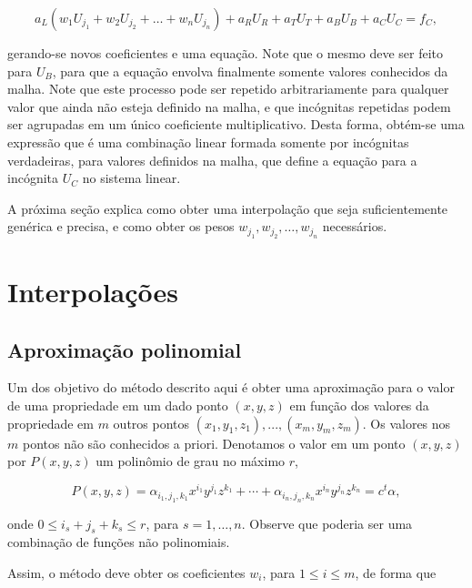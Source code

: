 \[
a_L \left( w_1 U_{j_1} + w_2 U_{j_2} + \dots + w_n U_{j_n} \right) + a_R U_{R} + a_T U_{T} + a_B U_{B} + a_C U_{C}  = f_{C},
\]

\noindent gerando-se novos coeficientes e uma equação. Note que o mesmo deve
ser feito para $U_B$, para que a equação envolva finalmente somente valores
conhecidos da malha. Note que este processo pode ser repetido arbitrariamente
para qualquer valor que ainda não esteja definido na malha, e que incógnitas
repetidas podem ser agrupadas em um único coeficiente multiplicativo. Desta
forma, obtém-se uma expressão que é uma combinação linear formada somente por
incógnitas verdadeiras, para valores definidos na malha, que define a equação
para a incógnita $U_C$ no sistema linear.

A próxima seção explica como obter uma interpolação que seja suficientemente
genérica e precisa, e como obter os pesos $w_{j_1}, w_{j_2}, \dots , w_{j_n}$
necessários.

\section{Interpolações}

\subsection{Aproximação polinomial}
\label{sec:poly}

Um dos objetivo do método descrito aqui é obter uma aproximação para o valor de
uma propriedade em um dado ponto $(x, y, z)$ em função dos valores da
propriedade em $m$ outros pontos $(x_1, y_1, z_1),..., (x_{m}, y_{m}, z_{m})$.
Os valores nos $m$ pontos não são conhecidos a priori.  Denotamos o valor em um
ponto $(x, y, z)$ por $P(x, y, z)$ um polinômio de grau no máximo $r$,

$$
P(x,y,z) = \alpha_{i_1,j_1,k_1}  x^{i_1} y^{j_1} z^{k_1} + \cdots +  \alpha_{i_n,j_n,k_n}  x^{i_n} y^{j_n} z^{k_n}=  c^t \alpha,
$$

\noindent onde $0 \leq i_s + j_s + k_s \leq r$, para $s = 1,\ldots,n$. Observe
que poderia ser uma combinação de funções não polinomiais.

Assim, o método deve obter os coeficientes $w_i$, para $1 \le i \le m$, de
forma que

